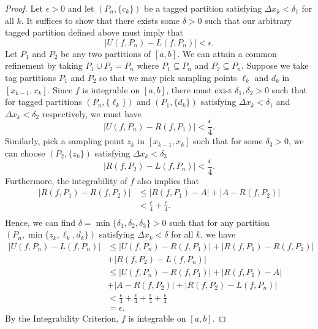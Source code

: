 \begin{proof}
Let \( \epsilon > 0  \) and let \( (P_n, \{ c_{k } \} ) \) be a tagged partition satisfying  \( \Delta x_{k} < \delta_1   \) for all  \( k \). It suffices to show that there exists some \( \delta > 0  \) such that our arbitrary tagged partition defined above must imply that
\[  | U(f, P_{n}) - L(f, P_{n}) | < \epsilon.  \]
Let \( P_{1} \) and \( P_{2} \) be any two partitions of \( [a,b]  \). We can attain a common refinement by taking \( P_{1} \cup P_{2} = P_{n} \) where \( P_{1} \subseteq P_{n} \) and \( P_{2} \subseteq P_{n} \). Suppose we take tag partitions \( P_{1} \) and \( P_{2} \) so that we may pick sampling points \( \ell_{k } \) and \( d_{ k }  \) in \( [x_{k-1} , x_{k}] \). Since \( f  \) is integrable on \( [a,b]  \), there must exist \( \delta_1, \delta_2  > 0  \) such that for tagged partitions \( (P_{n}, \{ \ell_k  \} )  \) and \( ( P_{1}, \{ d_{k } \} ) \) satisfying \( \Delta x_{k } < \delta_1  \) and \( \Delta x_{k } < \delta_2  \) respectively, we must have
\[  | U(f, P_{n}) - R(f, P_{1}) | < \frac{ \epsilon  }{ 4 }.\]
Similarly, pick a sampling point \( z_{k } \) in \( [x_{k-1}, x_{ k }] \) such that for some \( \delta_3 > 0  \), we can choose \( (P_{2}, \{ z_{k} \} ) \) satisfying \( \Delta x_{k } < \delta_3  \)
\[  | R(f, P_{2}) - L(f, P_{n}) | < \frac{ \epsilon  }{ 4 }.  \]
Furthermore, the integrability of \( f  \) also implies that 
\begin{align*}
	| R(f, P_{1}) - R(f,P_{2}) |   &\leq | R(f, P_{1}) - A  | + | A - R(f, P_{2}) | \\ 
								   &< \frac{ \epsilon }{ 4  } + \frac{ \epsilon  }{ 4  }.   \\
\end{align*}
Hence, we can find \( \delta = \min \{ \delta_{1}, \delta_{2}, \delta_{3}  \}  > 0  \) such that for any partition \( (P_{n}, \min \{ z_{k}, \ell_{k }, d_{k } \} ) \) satisfying \( \Delta x_{k } < \delta  \) for all \( k  \), we have
\begin{align*}
	| U(f, P_{n}) - L(f, P_{n}) | &\leq | U(f, P_{n}) - R(f, P_{1})   | + | R(f, P_{1}) - R(f, P_{2}) | \\ &+ | R(f,P_{2}) - L(f, P_{n}) |  \\
								  &\leq | U(f, P_{n}) - R(f, P_{1}) | + | R(f, P_{1}) - A | \\ &+  | A  - R(f, P_{2}) | + | R(f, P_{2}) - L(f, P_{n}) |  \\  
								  &< \frac{ \epsilon  }{ 4  } + \frac{ \epsilon  }{ 4  }  + \frac{ \epsilon  }{ 4  } + \frac{ \epsilon  }{ 4  } \\
								  &= \epsilon.
\end{align*}
By the Integrability Criterion, \( f  \) is integrable on \( [a,b] \).
\end{proof}

